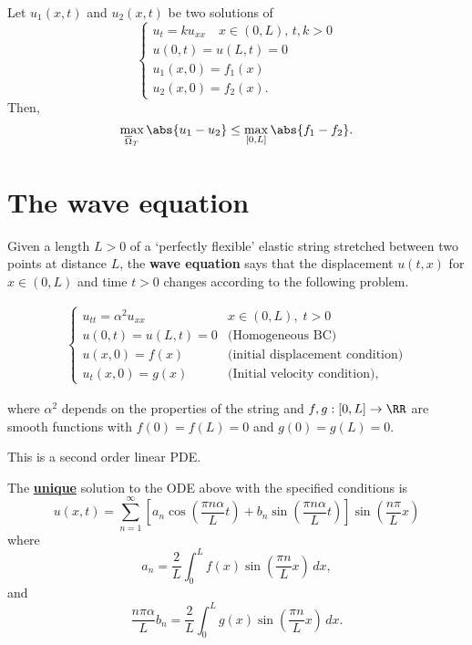 \documentclass[12pt, a4paper]{article}
\begin{document}
\begin{mdprop}
    Let \(u_1(x,t)\) and \(u_2(x,t)\) be two solutions of 
    \[\begin{cases}
        u_t=ku_{xx} \quad x \in (0,L), \, t,k>0 \\
        u(0,t)=u(L,t)=0 \\
        u_1(x,0)=f_1(x) \\
        u_2(x,0)=f_2(x).
    \end{cases}\]
    Then,
    \[\max_{\overline{\Omega}_T} \abs{u_1-u_2} \leq \max_{[0,L]} \abs{f_1-f_2}.\]
\end{mdprop}

\section{The wave equation}

Given a length \(L>0\) of a `perfectly flexible' elastic string stretched between two points at distance \(L\), the \textbf{wave equation} says that the displacement \(u(t,x)\) for \(x \in (0,L)\) and time \(t>0\) changes according to the following problem.

\[\begin{aligned}
    \begin{cases}
        u_{tt}=\alpha^2 u_{xx} & x\in(0,L), \; t>0 \\
        u(0,t)=u(L,t) =0 & \text{(Homogeneous BC)} \\
        u(x,0) =f(x) & \text{(initial displacement condition)} \\
        u_t(x,0)=g(x) & \text{(Initial velocity condition)},
    \end{cases}
\end{aligned}\]

where \(\alpha^2\) depends on the properties of the string and \(f,g:[0,L] \to \RR\) are smooth functions with \(f(0)=f(L)=0\) and \(g(0)=g(L)=0\).

\begin{mdremark}
    This is a second order linear PDE.
\end{mdremark}

\begin{mdthm}
    The \underline{\textbf{unique}} solution to the ODE above with the specified conditions is 
    \[u(x,t) = \sum_{n=1}^{\infty} \left[ a_n \cos\left( \frac{\pi n \alpha}{L}t \right)+b_n \sin\left( \frac{\pi n \alpha}{L}t \right) \right] \sin\left( \frac{n \pi}{L}x \right)\]
    where 
    \[a_n = \frac{2}{L} \int_0^L f(x) \sin\left( \frac{\pi n}{L}x \right) \, dx,\]
    and 
    \[\frac{n \pi \alpha}{L} b_n = \frac{2}{L} \int_0^L  g(x) \sin \left( \frac{\pi n}{L}x \right) \, dx.\]
\end{mdthm}
\end{document}
